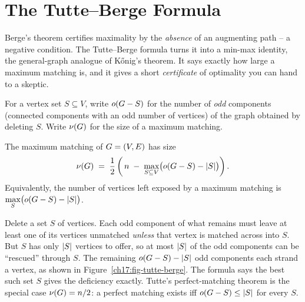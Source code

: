 \section{The Tutte--Berge Formula}

Berge's theorem certifies maximality by the \emph{absence} of an augmenting path -- a negative
condition. The Tutte--Berge formula turns it into a min-max identity, the general-graph analogue
of K\H{o}nig's theorem. It says exactly how large a maximum matching is, and it gives a short
\emph{certificate} of optimality you can hand to a skeptic.

For a vertex set $S\subseteq V$, write $o(G-S)$ for the number of \emph{odd} components (connected
components with an odd number of vertices) of the graph obtained by deleting $S$. Write $\nu(G)$
for the size of a maximum matching.

\begin{theorem}
\label{ch17:thm-tutte-berge}
The maximum matching of $G=(V,E)$ has size
\[
\nu(G) \;=\; \frac{1}{2}\left( \,n \;-\; \max_{S\subseteq V}\bigl( o(G-S) - \lvert S\rvert \bigr) \right).
\]
Equivalently, the number of vertices left exposed by a maximum matching is
$\displaystyle \max_{S}\bigl(o(G-S)-\lvert S\rvert\bigr)$.
\end{theorem}

\begin{intuitionbox}
Delete a set $S$ of vertices. Each odd component of what remains must leave at least one of its
vertices unmatched \emph{unless} that vertex is matched across into $S$. But $S$ has only $\lvert S\rvert$
vertices to offer, so at most $\lvert S\rvert$ of the odd components can be ``rescued'' through $S$. The
remaining $o(G-S)-\lvert S\rvert$ odd components each strand a vertex, as shown in Figure~\ref{ch17:fig-tutte-berge}. The formula says the best such
set $S$ gives the deficiency exactly. Tutte's perfect-matching theorem is the special
case $\nu(G)=n/2$: a perfect matching exists iff $o(G-S)\le\lvert S\rvert$ for every $S$.
\end{intuitionbox}


